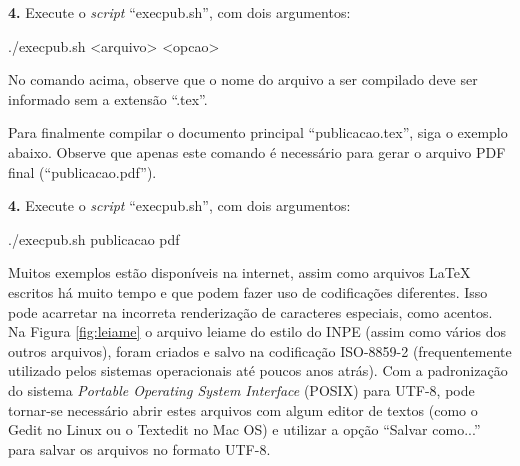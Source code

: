 \textbf{4.} Execute o \textit{script} ``execpub.sh'', com dois argumentos:
\begin{commandshell}
./execpub.sh <arquivo> <opcao>
\end{commandshell}

No comando acima, observe que o nome do arquivo a ser compilado deve ser informado sem a extensão ``.tex''.

Para finalmente compilar o documento principal ``publicacao.tex'', siga o exemplo abaixo. Observe que apenas este comando é necessário para gerar o arquivo PDF final (``publicacao.pdf'').

\textbf{4.} Execute o \textit{script} ``execpub.sh'', com dois argumentos:
\begin{commandshell}
./execpub.sh publicacao pdf
\end{commandshell}

Muitos exemplos estão disponíveis na internet, assim como arquivos LaTeX escritos há muito tempo e que podem fazer uso de codificações diferentes. Isso pode acarretar na incorreta renderização de caracteres especiais, como acentos. Na Figura \ref{fig:leiame} o arquivo leiame do estilo do INPE (assim como vários dos outros arquivos), foram criados e salvo na codificação ISO-8859-2 (frequentemente utilizado pelos sistemas operacionais até poucos anos atrás). Com a padronização do sistema \textit{Portable Operating System Interface} (POSIX) para UTF-8, pode tornar-se necessário abrir estes arquivos com algum editor de textos (como o Gedit no Linux ou o Textedit no Mac OS) e utilizar a opção ``Salvar como...'' para salvar os arquivos no formato UTF-8. 

